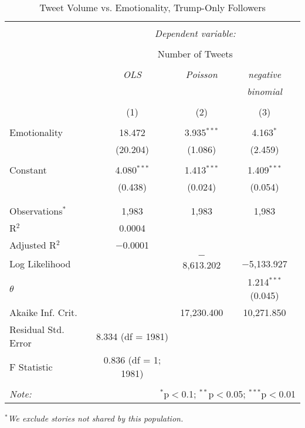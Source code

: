 \begin{table}[!htbp] \centering 
  \caption{Tweet Volume vs. Emotionality, Trump-Only Followers} 
  \label{} 
    \begin{tabular}{@{\extracolsep{5pt}}lccc} 
    \\[-1.8ex]\hline 
    \hline \\[-1.8ex] 
     & \multicolumn{3}{c}{\textit{Dependent variable:}} \\ 
    \cline{2-4} 
    \\[-1.8ex] & \multicolumn{3}{c}{Number of Tweets} \\ 
    \\[-1.8ex] & \textit{OLS} & \textit{Poisson} & \textit{negative} \\ 
     & \textit{} & \textit{} & \textit{binomial} \\ 
    \\[-1.8ex] & (1) & (2) & (3)\\ 
    \hline \\[-1.8ex] 
     Emotionality & 18.472 & 3.935$^{***}$ & 4.163$^{*}$ \\ 
      & (20.204) & (1.086) & (2.459) \\ 
      & & & \\ 
     Constant & 4.080$^{***}$ & 1.413$^{***}$ & 1.409$^{***}$ \\ 
      & (0.438) & (0.024) & (0.054) \\ 
      & & & \\ 
    \hline \\[-1.8ex] 
    Observations$^{*}$ & 1,983 & 1,983 & 1,983 \\ 
    R$^{2}$ & 0.0004 &  &  \\ 
    Adjusted R$^{2}$ & $-$0.0001 &  &  \\ 
    Log Likelihood &  & $-$8,613.202 & $-$5,133.927 \\ 
    $\theta$ &  &  & 1.214$^{***}$  (0.045) \\ 
    Akaike Inf. Crit. &  & 17,230.400 & 10,271.850 \\ 
    Residual Std. Error & 8.334 (df = 1981) &  &  \\ 
    F Statistic & 0.836 (df = 1; 1981) &  &  \\ 
    \hline 
    \hline \\[-1.8ex] 
    \textit{Note:}  & \multicolumn{3}{r}{$^{*}$p$<$0.1; $^{**}$p$<$0.05; $^{***}$p$<$0.01} \\ 
    \end{tabular} 
\end{table} 
\emph{$^{*}$We exclude stories not shared by this population.} 
\newpage 

